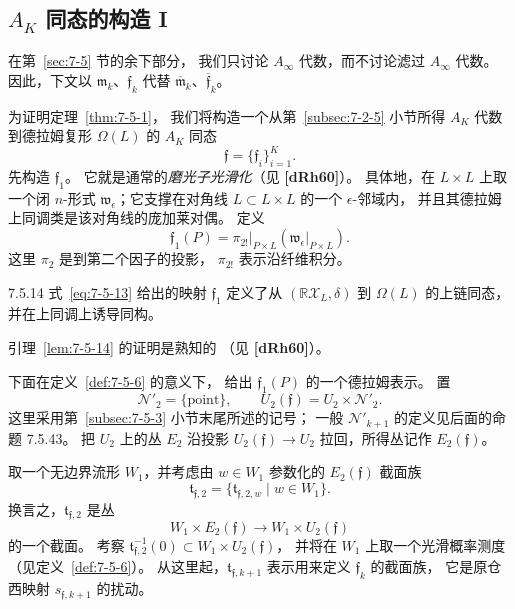 
\subsection{$A_K$ 同态的构造 I}
\label{subsec:7-5-4}

在第~\ref{sec:7-5} 节的余下部分，
我们只讨论 $A_\infty$ 代数，而不讨论滤过 $A_\infty$ 代数。
因此，下文以 $\mathfrak m_k$、$\mathfrak f_k$
代替 $\overline{\mathfrak m}_k$、$\overline{\mathfrak f}_k$。

为证明定理~\ref{thm:7-5-1}，
我们将构造一个从第~\ref{subsec:7-2-5} 小节所得 $A_K$ 代数
到德拉姆复形 $\Omega(L)$ 的 $A_K$ 同态
\[
\mathfrak f=\{\mathfrak f_i\}_{i=1}^{K}.
\]
先构造 $\mathfrak f_1$。
它就是通常的\emph{磨光子光滑化}（见 \textbf{[dRh60]}）。
具体地，在 $L\times L$ 上取一个闭 $n$-形式
$\mathfrak w_\epsilon$；它支撑在对角线
$L\subset L\times L$ 的一个 $\epsilon$-邻域内，
并且其德拉姆上同调类是该对角线的庞加莱对偶。
定义
\begin{equation}
\mathfrak f_1(P)
=\left.\pi_{2!}\right|_{P\times L}
\left(\left.\mathfrak w_\epsilon\right|_{P\times L}\right).
\tag{7.5.13}\label{eq:7-5-13}
\end{equation}
这里 $\pi_2$ 是到第二个因子的投影，
$\pi_{2!}$ 表示沿纤维积分。

\begin{lemma}{7.5.14}\label{lem:7-5-14}
式~\eqref{eq:7-5-13} 给出的映射 $\mathfrak f_1$
定义了从 $(\mathbb R\mathcal X_L,\delta)$ 到 $\Omega(L)$
的上链同态，并在上同调上诱导同构。
\end{lemma}

引理~\ref{lem:7-5-14} 的证明是熟知的
（见 \textbf{[dRh60]}）。

下面在定义~\ref{def:7-5-6} 的意义下，
给出 $\mathfrak f_1(P)$ 的一个德拉姆表示。
置
\[
\mathcal N'_2=\{\mathrm{point}\},
\qquad
U_2(\mathfrak f)=U_2\times\mathcal N'_2.
\]
这里采用第~\ref{subsec:7-5-3} 小节末尾所述的记号；
一般 $\mathcal N'_{k+1}$ 的定义见后面的命题 7.5.43。
把 $U_2$ 上的丛 $E_2$ 沿投影
$U_2(\mathfrak f)\to U_2$ 拉回，所得丛记作
$E_2(\mathfrak f)$。

取一个无边界流形 $W_1$，并考虑由 $w\in W_1$
参数化的 $E_2(\mathfrak f)$ 截面族
\[
\mathfrak t_{\mathfrak f,2}
=\{\mathfrak t_{\mathfrak f,2,w}\mid w\in W_1\}.
\]
换言之，$\mathfrak t_{\mathfrak f,2}$ 是丛
\[
W_1\times E_2(\mathfrak f)
\longrightarrow W_1\times U_2(\mathfrak f)
\]
的一个截面。
考察
$\mathfrak t_{\mathfrak f,2}^{-1}(0)
\subset W_1\times U_2(\mathfrak f)$，
并将在 $W_1$ 上取一个光滑概率测度
（见定义~\ref{def:7-5-6}）。
从这里起，$\mathfrak t_{\mathfrak f,k+1}$
表示用来定义 $\mathfrak f_k$ 的截面族，
它是原仓西映射 $s_{\mathfrak f,k+1}$ 的扰动。

